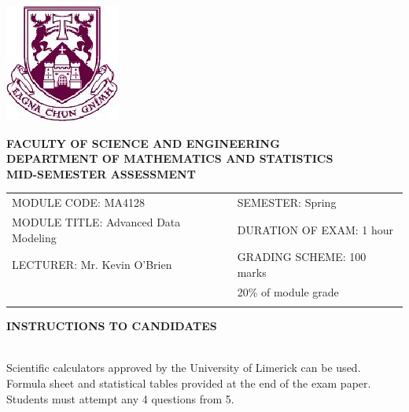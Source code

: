 \documentclass[a4paper,12pt]{article}
\begin{document}
\begin{center}
       \includegraphics[scale=0.55]{shieldtransparent2}
\end{center}

\begin{center}
\vspace{1cm}
\large \bf {FACULTY OF SCIENCE AND ENGINEERING} \\[0.5cm]
\normalsize DEPARTMENT OF MATHEMATICS AND STATISTICS \\[1.25cm]
\large \bf {MID-SEMESTER ASSESSMENT} \\[1.5cm]
\end{center}

\begin{tabular}{ll}
MODULE CODE: MA4128 & SEMESTER: Spring \\[1cm]
MODULE TITLE: Advanced Data Modeling & DURATION OF EXAM: 1 hour \\[1cm]
LECTURER: Mr. Kevin O'Brien & GRADING SCHEME: 100 marks \\
& \phantom{GRADING SCHEME:} \footnotesize {20\% of module grade} \\[0.8cm]
\\[1cm]
\end{tabular}
\begin{center}
{\bf INSTRUCTIONS TO CANDIDATES}
\end{center}

{\noindent \\ Scientific calculators approved by the University of Limerick can be used. \\
Formula sheet and statistical tables provided at the end of the exam paper.\\
Students must attempt any 4 questions from 5.}
\newpage



\end{document}
